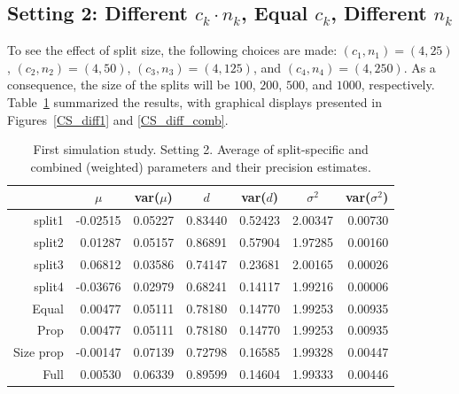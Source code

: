 \documentclass[11pt,a5paper,twoside]{book}
\begin{document}
{\subsection[Setting 2]{Setting 2: Different $c_k\cdot n_k$, Equal $c_k$, Different $n_k$}

To see the effect of split size, the following choices are made:
$(c_1,n_1)=(4,25)$,  $(c_2,n_2)=(4,50)$,  $(c_3,n_3)=(4,125)$, and $(c_4,n_4)=(4,250)$.
As a consequence, the size of the splits will be $100$, $200$, $500$, and $1000$, respectively. Table~\ref{tab_diff1} summarized the results, with graphical displays presented in Figures~\ref{CS_diff1} and \ref{CS_diff_comb}.
\begin{table}[t]
\centering
\caption{\small \linespread{1.1} First simulation study. Setting 2. Average of split-specific and combined (weighted) parameters and their precision estimates.}
\label{tab_diff1}

\vspace*{2mm}

\def\arraystretch{0.6} \begin{tabular}{rrrrrrr}
\hline  \hline
  & \multicolumn{1}{c}{$\mu$} & \multicolumn{1}{c}{\mbox{var}($\mu$)} & \multicolumn{1}{c}{$d$} & \multicolumn{1}{c}{\mbox{var}($d$)} & \multicolumn{1}{c}{$\sigma^2$} & \multicolumn{1}{c}{\mbox{var}($\sigma^2$)} \\
\hline
split1 & -0.02515 & 0.05227 & 0.83440 & 0.52423 & 2.00347 & 0.00730 \\
  split2 & 0.01287 & 0.05157 & 0.86891 & 0.57904 & 1.97285 & 0.00160 \\
  split3 & 0.06812 & 0.03586 & 0.74147 & 0.23681 & 2.00165 & 0.00026 \\
  split4 & -0.03676 & 0.02979 & 0.68241 & 0.14117 & 1.99216 & 0.00006 \\
  \hline
 Equal & 0.00477 & 0.05111 & 0.78180 & 0.14770 & 1.99253 & 0.00935 \\
  Prop & 0.00477 & 0.05111 & 0.78180 & 0.14770 & 1.99253 & 0.00935 \\
  Size prop & -0.00147 & 0.07139 & 0.72798 & 0.16585 & 1.99328 & 0.00447 \\
  Full & 0.00530 & 0.06339 & 0.89599 & 0.14604 & 1.99333 & 0.00446 \\
 \hline
\hline
\end{tabular}
\end{table}

}
\end{document}

